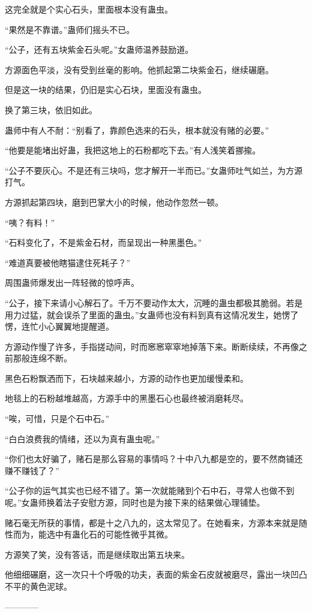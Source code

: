 \begin{this_body}
这完全就是个实心石头，里面根本没有蛊虫。

“果然是不靠谱。”蛊师们摇头不已。

“公子，还有五块紫金石头呢。”女蛊师温养鼓励道。

方源面色平淡，没有受到丝毫的影响。他抓起第二块紫金石，继续碾磨。

但是这一块的结果，仍旧是实心石块，里面没有蛊虫。

换了第三块，依旧如此。

蛊师中有人不耐：“别看了，靠颜色选来的石头，根本就没有赌的必要。”

“他要是能堵出好蛊，我把这地上的石粉都吃下去。”有人浅笑着挪揄。

“公子不要灰心。不是还有三块吗，您才解开一半而已。”女蛊师吐气如兰，为方源打气。

方源抓起第四块，磨到巴掌大小的时候，他动作忽然一顿。

“咦？有料！”

“石料变化了，不是紫金石材，而呈现出一种黑墨色。”

“难道真要被他瞎猫逮住死耗子？”

周围蛊师爆发出一阵轻微的惊呼声。

“公子，接下来请小心解石了。千万不要动作太大，沉睡的蛊虫都极其脆弱。若是用力过猛，就会误杀了里面的蛊虫。”女蛊师也没有料到真有这情况发生，她愣了愣，连忙小心翼翼地提醒道。

方源动作慢了许多，手指搓动间，时而窸窸窣窣地掉落下来。断断续续，不再像之前那般连绵不断。

黑色石粉飘洒而下，石块越来越小，方源的动作也更加缓慢柔和。

地毯上的石粉越堆越高，方源手中的黑墨石心也最终被消磨耗尽。

“唉，可惜，只是个石中石。”

“白白浪费我的情绪，还以为真有蛊虫呢。”

“你们也太好骗了，赌石是那么容易的事情吗？十中八九都是空的，要不然商铺还赚不赚钱了？”

“公子你的运气其实也已经不错了。第一次就能赌到个石中石，寻常人也做不到呢。”女蛊师换着法子安慰方源，同时也是为接下来的结果做心理铺垫。

赌石毫无所获的事情，都是十之八九的，这太常见了。在她看来，方源本来就是随性而为，能选中有蛊化石的可能性微乎其微。

方源笑了笑，没有答话，而是继续取出第五块来。

他细细碾磨，这一次只十个呼吸的功夫，表面的紫金石皮就被磨尽，露出一块凹凸不平的黄色泥球。

------------

\end{this_body}

